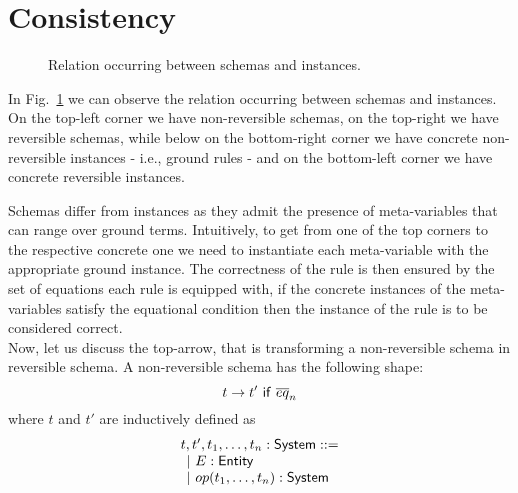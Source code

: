 \documentclass{article}[12pt,a4paper]
\theoremstyle{definition}
\begin{document}
\section{Consistency}

\begin{figure}
  \centering
  \caption{ Relation occurring between schemas and instances. }
  \label{fig:square}
\end{figure}

In Fig.~\ref{fig:square} we can observe the relation occurring between schemas
and instances. On the top-left corner we have non-reversible schemas, on the
top-right we have reversible schemas, while below on the
bottom-right corner we have concrete non-reversible instances - i.e., ground
rules - and on the bottom-left corner we have concrete reversible instances.

Schemas differ from instances as they admit the presence of meta-variables that
can range over ground terms. Intuitively, to get from one of the top corners to
the respective concrete one we need to instantiate each meta-variable with
the appropriate ground instance. The correctness of the rule is then ensured by
the set of equations each rule is equipped with, if the concrete instances of
the meta-variables satisfy the equational condition then the instance of the
rule is to be considered correct.\\

Now, let us discuss the top-arrow, that is transforming a non-reversible schema in reversible
schema. A non-reversible schema has the following shape:
\[t \rightarrow t'~\mathsf{if}~\overline{eq}_n\]
where $t$ and $t'$ are inductively defined as
\[
  \begin{array}{l}
    t,t',t_1,\ldots,t_n: \mathsf{System} ::=\\
    \hspace{1ex}|~E: \mathsf{Entity}\\
    \hspace{1ex}|~op(t_1,\ldots,t_n): \mathsf{System}\\
  \end{array}
\]
\end{document}
